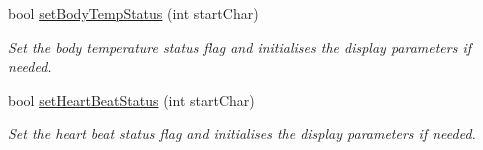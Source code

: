 \begin{DoxyCompactItemize}
bool \hyperlink{_meditech___chip_kit_control_panel_8pde_a40ac0af2d0c4437faa8aebff8336b19b}{set\-Body\-Temp\-Status} (int start\-Char)
\begin{DoxyCompactList}\small\item\em Set the body temperature status flag and initialises the display parameters if needed. \end{DoxyCompactList}\item 
bool \hyperlink{_meditech___chip_kit_control_panel_8pde_aac2c481fecf0a8b7db0babe49a27d1ea}{set\-Heart\-Beat\-Status} (int start\-Char)
\begin{DoxyCompactList}\small\item\em Set the heart beat status flag and initialises the display parameters if needed. \end{DoxyCompactList}\end{DoxyCompactItemize}
